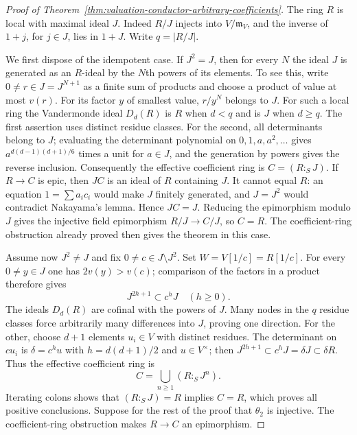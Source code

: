 \begin{proof}[Proof of Theorem~\ref{thm:valuation-conductor-arbitrary-coefficients}]
The ring $R$ is local with maximal ideal $J$. Indeed $R/J$ injects
into $V/\mathfrak m_V$, and the inverse of $1+j$, for $j\in J$, lies
in $1+J$. Write $q=|R/J|$.

We first dispose of the idempotent case. If $J^2=J$, then for every
$N$ the ideal $J$ is generated as an $R$-ideal by the $N$th powers
of its elements. To see this, write $0\ne r\in J=J^{N+1}$ as a
finite sum of products and choose a product of value at most $v(r)$.
For its factor $y$ of smallest value, $r/y^N$ belongs to $J$.
For such a local ring the Vandermonde ideal $D_d(R)$ is $R$ when
$d<q$ and is $J$ when $d\ge q$. The first assertion uses distinct
residue classes. For the second, all determinants belong to $J$;
evaluating the determinant polynomial on $0,1,a,a^2,\ldots$ gives
$a^{d(d-1)(d+1)/6}$ times a unit for $a\in J$, and the generation
by powers gives the reverse inclusion. Consequently the effective
coefficient ring is $C=(R:_S J)$. If $R\to C$ is epic, then $JC$ is
an ideal of $R$ containing $J$. It cannot equal $R$: an equation
$1=\sum a_ic_i$ would make $J$ finitely generated, and $J=J^2$ would
contradict Nakayama's lemma. Hence $JC=J$. Reducing the epimorphism
modulo $J$ gives the injective field epimorphism $R/J\to C/J$, so
$C=R$. The coefficient-ring obstruction already proved then gives
the theorem in this case.

Assume now $J^2\ne J$ and fix $0\ne c\in J\setminus J^2$. Set
$W=V[1/c]=R[1/c]$. For every $0\ne y\in J$ one has
$2v(y)>v(c)$; comparison of the factors in a product therefore gives
\begin{equation}\label{eq:conductor-power-control}
                        J^{2h+1}\subset c^hJ\quad(h\ge0).
\end{equation}
The ideals $D_d(R)$ are cofinal with the powers of $J$. Many nodes
in the $q$ residue classes force arbitrarily many differences into
$J$, proving one direction. For the other, choose $d+1$ elements
$u_i\in V$ with distinct residues. The determinant on $cu_i$ is
$\delta=c^hu$ with $h=d(d+1)/2$ and $u\in V^\times$; then
$J^{2h+1}\subset c^hJ=\delta J\subset\delta R$.
Thus the effective coefficient ring is
\[
                            C=\bigcup_{n\ge1}(R:_S J^n).
\]
Iterating colons shows that $(R:_S J)=R$ implies $C=R$, which proves
all positive conclusions. Suppose for the rest of the proof that
$\theta_2$ is injective. The coefficient-ring obstruction makes
$R\to C$ an epimorphism.


\end{proof}
